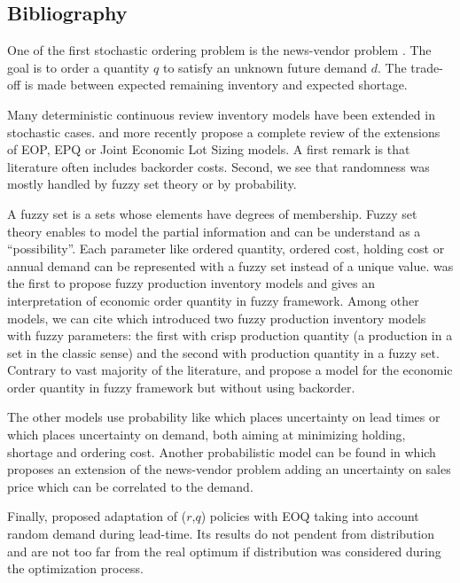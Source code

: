 \subsection{Bibliography}


One of the first stochastic ordering problem is the news-vendor problem \cite{Edgeworth88,Arrow1951}.
The goal is to order a quantity $q$ to satisfy an unknown future demand $d$.
The trade-off is made between expected remaining inventory and expected shortage.


Many deterministic continuous review inventory models have been extended in stochastic cases.
\cite{Candace1995} and more recently \cite{Ziukov2015} propose a complete review of the extensions of EOP, EPQ or Joint Economic Lot Sizing models.
A first remark is that literature often includes backorder costs.
Second, we see that randomness was mostly handled by fuzzy set theory or by probability.


\medskip


A fuzzy set is a sets whose elements have degrees of membership.
Fuzzy set theory enables to model the partial information and can be understand as a ``possibility''.
Each parameter like ordered quantity, ordered cost, holding cost or annual demand can be represented with a fuzzy set instead of a unique value.
\cite{Park1987} was the first to propose fuzzy production inventory models and gives an interpretation of economic order quantity in fuzzy framework.
Among other models, we can cite \cite{Hsieh2002} which introduced two fuzzy production inventory models with fuzzy parameters: the first with crisp production quantity (\ie a production in a set in the classic sense) and the second with production quantity in a fuzzy set.
Contrary to vast majority of the literature, \cite{Lee1999} and \cite{Wang2007} propose a model for the economic order quantity in fuzzy framework but without using backorder.



The other models use probability like \cite{Friedman1984} which places uncertainty on lead times or \cite{Eynan2007} which places uncertainty on demand, both aiming at minimizing holding, shortage and ordering cost.
Another probabilistic model can be found in \cite{Sana2011} which proposes an extension of the news-vendor problem adding an uncertainty on sales price which can be correlated to the demand.


Finally, \cite{Gallego1998} proposed adaptation of ($r$,$q$) policies with EOQ taking into account random demand during lead-time.
Its results do not pendent from distribution and are not too far from the real optimum if distribution was considered during the optimization process.


